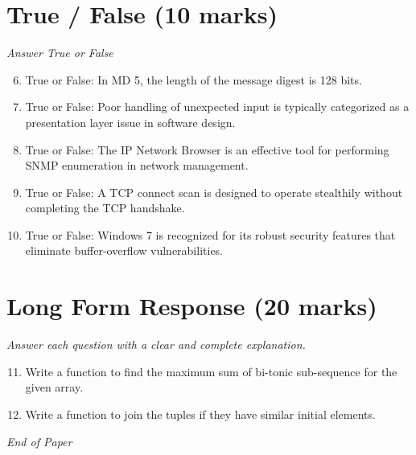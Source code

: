 \documentclass[12pt]{article}
\begin{document}
\section*{True / False (10 marks)}
\textit{Answer True or False}
\begin{enumerate}[label=\arabic*.]
\setcounter{enumi}{5}
\item True or False: In MD 5, the length of the message digest is 128 bits.
\item True or False: Poor handling of unexpected input is typically categorized as a presentation layer issue in software design.
\item True or False: The IP Network Browser is an effective tool for performing SNMP enumeration in network management.
\item True or False: A TCP connect scan is designed to operate stealthily without completing the TCP handshake.
\item True or False: Windows 7 is recognized for its robust security features that eliminate buffer-overflow vulnerabilities.
\end{enumerate}

\section*{Long Form Response (20 marks)}
\textit{Answer each question with a clear and complete explanation.}
\begin{enumerate}[label=\arabic*.]
\setcounter{enumi}{10}
\item Write a function to find the maximum sum of bi-tonic sub-sequence for the given array.
\item Write a function to join the tuples if they have similar initial elements.
\end{enumerate}

\vfill
\noindent\textit{End of Paper}
\end{document}
